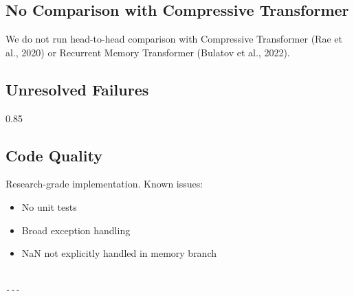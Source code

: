 \subsection{No Comparison with Compressive Transformer}

We do not run head-to-head comparison with Compressive Transformer (Rae et 
al., 2020) or Recurrent Memory Transformer (Bulatov et al., 2022).

\subsection{Unresolved Failures}

0.85

\subsection{Code Quality}

Research-grade implementation. Known issues:

\begin{itemize}
\item No unit tests
\item Broad exception handling
\item NaN not explicitly handled in memory branch
\end{itemize}
\begin{lstlisting}

---
\end{lstlisting}
